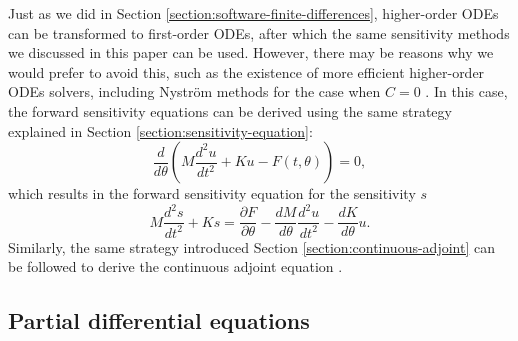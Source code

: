 Just as we did in Section \ref{section:software-finite-differences}, higher-order ODEs can be transformed to first-order ODEs, after which the same sensitivity methods we discussed in this paper can be used. 
However, there may be reasons why we would prefer to avoid this, such as the existence of more efficient higher-order ODEs solvers, including Nystr\"{o}m methods for the case when $C = 0$ \cite{Butcher_Wanner_1996, hairer-solving-1}. 
In this case, the forward sensitivity equations can be derived using the same strategy explained in Section \ref{section:sensitivity-equation}: 
\begin{equation}
    \frac{d}{d\theta} 
    \left(
    M \frac{d^2 u}{dt^2}
    + 
    K u
    -
    F(t, \theta)
    \right) = 0,
\end{equation}
which results in the forward sensitivity equation for the sensitivity $s$
\begin{equation}
    M \frac{d^2 s}{dt^2}
    + 
    K s
    = 
    \frac{\partial F}{\partial \theta} 
    - 
    \frac{dM}{d\theta} \frac{d^2 u}{dt^2}
    - 
    \frac{dK}{d\theta} u. 
\end{equation}
Similarly, the same strategy introduced Section \ref{section:continuous-adjoint} can be followed to derive the continuous adjoint equation \cite{kang2006review}. 



\subsection{Partial differential equations}




